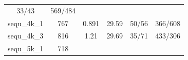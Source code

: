 \documentclass[]{article}
\begin{document}
\begin{longtable}[]{@{}cccccc@{}}
\begin{minipage}[t]{0.18\columnwidth}
33/43\strut
\end{minipage} & \begin{minipage}[t]{0.22\columnwidth}\centering\strut
569/484\strut
\end{minipage}\tabularnewline
\begin{minipage}[t]{0.11\columnwidth}\centering\strut
sequ\_4k\_1\strut
\end{minipage} & \begin{minipage}[t]{0.07\columnwidth}\centering\strut
767\strut
\end{minipage} & \begin{minipage}[t]{0.11\columnwidth}\centering\strut
0.891\strut
\end{minipage} & \begin{minipage}[t]{0.13\columnwidth}\centering\strut
29.59\strut
\end{minipage} & \begin{minipage}[t]{0.18\columnwidth}\centering\strut
50/56\strut
\end{minipage} & \begin{minipage}[t]{0.22\columnwidth}\centering\strut
366/608\strut
\end{minipage}\tabularnewline
\begin{minipage}[t]{0.11\columnwidth}\centering\strut
sequ\_4k\_3\strut
\end{minipage} & \begin{minipage}[t]{0.07\columnwidth}\centering\strut
816\strut
\end{minipage} & \begin{minipage}[t]{0.11\columnwidth}\centering\strut
1.21\strut
\end{minipage} & \begin{minipage}[t]{0.13\columnwidth}\centering\strut
29.69\strut
\end{minipage} & \begin{minipage}[t]{0.18\columnwidth}\centering\strut
35/71\strut
\end{minipage} & \begin{minipage}[t]{0.22\columnwidth}\centering\strut
433/306\strut
\end{minipage}\tabularnewline
\begin{minipage}[t]{0.11\columnwidth}\centering\strut
sequ\_5k\_1\strut
\end{minipage} & \begin{minipage}[t]{0.07\columnwidth}\centering\strut
718\strut
\end{minipage} & \begin{minipage}[t]{0.11\columnwidth}\centering\strut

\end{minipage}
\end{longtable}
\end{document}
